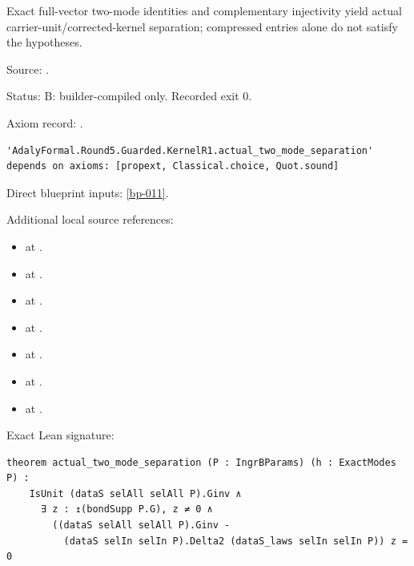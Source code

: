 \begin{theorem}[bp-056]
\label{bp-056}
\leanok
Exact full-vector two-mode identities and complementary injectivity yield actual carrier-unit/corrected-kernel separation; compressed entries alone do not satisfy the hypotheses.

\par Source: \texttt{}.
\par Status: B: builder-compiled only. Recorded exit 0.
\par Axiom record: \texttt{}.
\begin{verbatim}
'AdalyFormal.Round5.Guarded.KernelR1.actual_two_mode_separation' depends on axioms: [propext, Classical.choice, Quot.sound]
\end{verbatim}
\par Direct blueprint inputs: \ref{bp-011}.
\par Additional local source references:
\begin{itemize}
\item \texttt{} at \texttt{}.
\item \texttt{} at \texttt{}.
\item \texttt{} at \texttt{}.
\item \texttt{} at \texttt{}.
\item \texttt{} at \texttt{}.
\item \texttt{} at \texttt{}.
\item \texttt{} at \texttt{}.
\end{itemize}
\par Exact Lean signature:
\begin{verbatim}
theorem actual_two_mode_separation (P : IngrBParams) (h : ExactModes P) :
    IsUnit (dataS selAll selAll P).Ginv ∧
      ∃ z : ↥(bondSupp P.G), z ≠ 0 ∧
        ((dataS selAll selAll P).Ginv -
          (dataS selIn selIn P).Delta2 (dataS_laws selIn selIn P)) z = 0
\end{verbatim}
\end{theorem}

